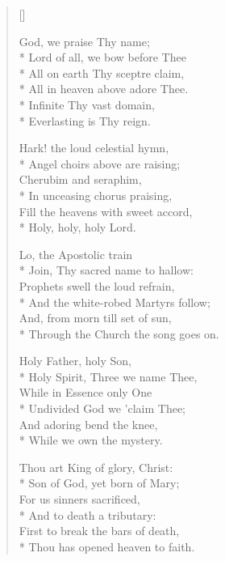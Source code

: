 \newHymn
{}

\begin{verse}[\versewidth]
\begin{patverse}
 God, we praise Thy name;\\*
Lord of all, we bow before Thee\\*
All on earth Thy sceptre claim,\\*
All in heaven above adore Thee.\pointorig\\*
Infinite Thy vast domain,\\*
Everlasting is Thy reign.
\end{patverse}

\begin{patverse}
Hark! the loud celestial hymn,\\*
Angel choirs above are raising;\\
Cherubim and seraphim,\\*
In unceasing chorus praising,\\
Fill the heavens with sweet accord,\\*
Holy, holy, holy Lord.
\end{patverse}

\begin{patverse}
Lo, the Apostolic train\\*
 Join, Thy sacred name to hallow:\\
 Prophets swell the loud refrain,\\*
 And the white-robed Martyrs follow;\\
 And, from morn till set of sun,\\*
 Through the Church the song goes on.
\end{patverse}


\begin{patverse}
Holy Father, holy Son,\\*
Holy Spirit, Three we name Thee,\\
While in Essence only One\\*
Undivided God we 'claim Thee;\\
And adoring bend the knee,\\*
While we own the mystery.
\end{patverse}

\begin{patverse}
Thou art King of glory, Christ:\\*
Son of God, yet born of Mary;\\     
For us sinners sacrificed,\\*
And to death a tributary:\\
First to break the bars of death,\\*
Thou has opened heaven to faith.                
\end{patverse}


\end{verse}
